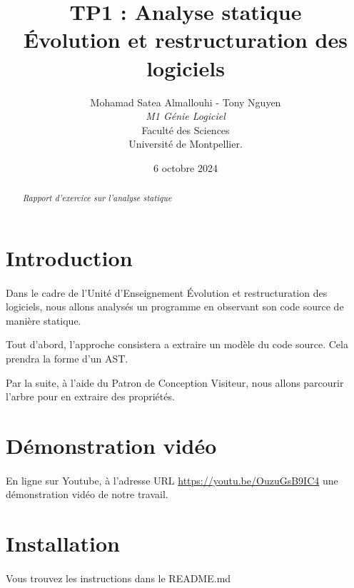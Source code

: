 \documentclass[a4paper]{article}
\title{  TP1 : Analyse statique\\Évolution et restructuration des logiciels}
\author{Mohamad Satea Almallouhi - Tony Nguyen\\\emph{M1 Génie Logiciel}\\Faculté des Sciences\\Université de Montpellier.}
\date{6 octobre 2024}
\begin{document}
    \maketitle
    \begin{center}
    \end{center}

    \begin{abstract}     %
      \emph{Rapport d'exercice sur l'analyse statique}
    \end{abstract}
    \newpage
    \tableofcontents
    \section*{Introduction}
            \paragraph{}
                Dans le cadre de l'Unité d'Enseignement Évolution et restructuration des logiciels, nous allons analysés un programme en observant son code source de manière statique.

                Tout d'abord, l'approche consistera a extraire un modèle du code source. Cela prendra la forme d'un AST.

                Par la suite, à l'aide du Patron de Conception Visiteur, nous allons parcourir l'arbre pour en extraire des propriétés.
        \section*{Démonstration vidéo}
            \paragraph{}
                En ligne sur Youtube, à l'adresse URL \url{https://youtu.be/OuzuGsB9IC4} une démonstration vidéo de notre travail.
        \section*{Installation}
            \paragraph{}
                Vous trouvez les instructions dans le README.md
\end{document}
